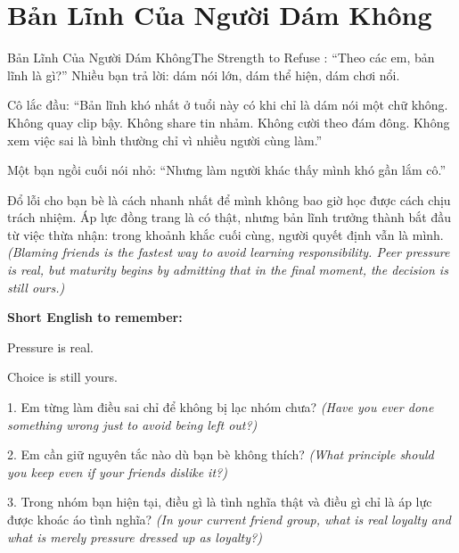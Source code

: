 \section{Bản Lĩnh Của Người Dám Không}
\begin{truyen}{Bản Lĩnh Của Người Dám Không}{The Strength to Refuse}
: ``Theo các em, bản lĩnh là gì?'' Nhiều bạn trả lời: dám nói lớn, dám thể hiện, dám chơi nổi.

Cô lắc đầu: ``Bản lĩnh khó nhất ở tuổi này có khi chỉ là dám nói một chữ không. Không quay clip bậy. Không share tin nhảm. Không cười theo đám đông. Không xem việc sai là bình thường chỉ vì nhiều người cùng làm.''

Một bạn ngồi cuối nói nhỏ: ``Nhưng làm người khác thấy mình khó gần lắm cô.''

\end{truyen}

\begin{baihoc}
Đổ lỗi cho bạn bè là cách nhanh nhất để mình không bao giờ học được cách chịu trách nhiệm. Áp lực đồng trang là có thật, nhưng bản lĩnh trưởng thành bắt đầu từ việc thừa nhận: trong khoảnh khắc cuối cùng, người quyết định vẫn là mình.
\textit{(Blaming friends is the fastest way to avoid learning responsibility. Peer pressure is real, but maturity begins by admitting that in the final moment, the decision is still ours.)}
\end{baihoc}

\begin{ghinhoanh}
\textbf{Short English to remember:}

Pressure is real.

Choice is still yours.
\end{ghinhoanh}

\begin{tuhocnhanh}
1. Em từng làm điều sai chỉ để không bị lạc nhóm chưa? \textit{(Have you ever done something wrong just to avoid being left out?)}

2. Em cần giữ nguyên tắc nào dù bạn bè không thích? \textit{(What principle should you keep even if your friends dislike it?)}

3. Trong nhóm bạn hiện tại, điều gì là tình nghĩa thật và điều gì chỉ là áp lực được khoác áo tình nghĩa? \textit{(In your current friend group, what is real loyalty and what is merely pressure dressed up as loyalty?)}
\end{tuhocnhanh}


